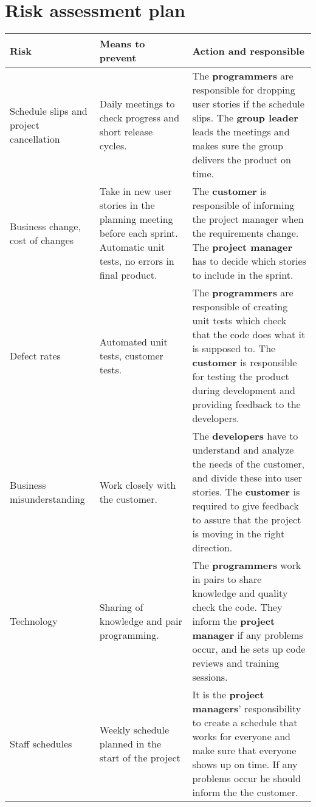 \section{Risk assessment plan}
\label{app:Risk assessment}
\begin{adjustbox}{center}
\begin{tabular}{ p{0.1\paperwidth} | p{0.25\paperwidth} | p{0.3\paperwidth} }
    Risk & Means to prevent & Action and responsible \\ \hline
    Schedule slips and project cancellation
    & Daily meetings to check progress and short release cycles.
    & The \textbf{programmers} are responsible for dropping user stories if the schedule slips. The \textbf{group leader} leads the meetings and makes sure the group delivers the product on time. \\ \hline
    Business change, cost of changes
    & Take in new user stories in the planning meeting before each sprint. Automatic unit tests, no errors in final product.
    & The \textbf{customer} is responsible of informing the project manager when the requirements change. The \textbf{project manager} has to decide which stories to include in the sprint. \\ \hline
    Defect rates
    & Automated unit tests, customer tests.
    & The \textbf{programmers} are responsible of creating unit tests which check that the code does what it is supposed to. The \textbf{customer} is responsible for testing the product during development and providing feedback to the developers. \\ \hline
    Business misunderstanding
    & Work closely with the customer.
    & The \textbf{developers} have to understand and analyze the needs of the customer, and divide these into user stories. The \textbf{customer} is required to give feedback to assure that the project is moving in the right direction. \\ \hline
    Technology
    & Sharing of knowledge and pair programming. 
    & The \textbf{programmers} work in pairs to share knowledge and quality check the code. They inform the \textbf{project manager} if any problems occur, and he sets up code reviews and training sessions. \\ \hline
    Staff schedules
    & Weekly schedule planned in the start of the project
    & It is the \textbf{project managers}' responsibility to create a schedule that works for everyone and make sure that everyone shows up on time. If any problems occur he should inform the the customer. \\ \hline
\end{tabular}
\end{adjustbox}